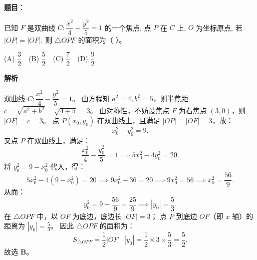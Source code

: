 \begin{answer}

\textbf{题目}：

已知 $F$ 是双曲线 $C: \dfrac{x^2}{4} - \dfrac{y^2}{5} = 1$ 的一个焦点, 点 $P$ 在 $C$ 上, $O$ 为坐标原点, 若 $|OP| = |OF|$, 则 $\triangle OPF$ 的面积为（ ）。

(A) $\dfrac{3}{2}$　(B) $\dfrac{5}{2}$　(C) $\dfrac{7}{2}$　(D) $\dfrac{9}{2}$

\textbf{解析}

双曲线 $C: \dfrac{x^2}{4} - \dfrac{y^2}{5} = 1$。
由方程知 $a^2 = 4, b^2 = 5$，则半焦距 $c = \sqrt{a^2 + b^2} = \sqrt{4 + 5} = 3$。
由对称性，不妨设焦点 $F$ 为右焦点 $(3, 0)$，则 $|OF| = c = 3$。
点 $P(x_0, y_0)$ 在双曲线上，且满足 $|OP| = |OF| = 3$，故：
\nopagebreak[4]
\[x_0^2 + y_0^2 = 9.\]
又点 $P$ 在双曲线上，满足：
\nopagebreak[4]
\[\frac{x_0^2}{4} - \frac{y_0^2}{5} = 1 \implies 5x_0^2 - 4y_0^2 = 20.\]
将 $y_0^2 = 9 - x_0^2$ 代入，得：
\nopagebreak[4]
\[5x_0^2 - 4(9 - x_0^2) = 20 \implies 9x_0^2 - 36 = 20 \implies 9x_0^2 = 56 \implies x_0^2 = \frac{56}{9}.\]
从而：
\nopagebreak[4]
\[y_0^2 = 9 - \frac{56}{9} = \frac{25}{9} \implies |y_0| = \frac{5}{3}.\]
在 $\triangle OPF$ 中，以 $OF$ 为底边，底边长 $|OF| = 3$；
点 $P$ 到底边 $OF$（即 $x$ 轴）的距离为 $|y_0| = \frac{5}{3}$。
因此 $\triangle OPF$ 的面积为：
\nopagebreak[4]
\[S_{\triangle OPF} = \frac{1}{2} |OF| \cdot |y_0| = \frac{1}{2} \times 3 \times \frac{5}{3} = \frac{5}{2}.\]
故选 \textbf{B}。


\end{answer}

